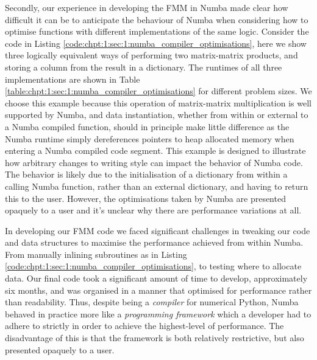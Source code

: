 Secondly, our experience in developing the FMM in Numba made clear how difficult it can be to anticipate the behaviour of Numba when considering how to optimise functions with different implementations of the same logic. Consider the code in Listing \ref{code:chpt:1:sec:1:numba_compiler_optimisations}, here we show three logically equivalent ways of performing two matrix-matrix products, and storing a column from the result in a dictionary. The runtimes of all three implementations are shown in Table \ref{table:chpt:1:sec:1:numba_compiler_optimisations} for different problem sizes. We choose this example because this operation of matrix-matrix multiplication is well supported by Numba, and data instantiation, whether from within or external to a Numba compiled function, should in principle make little difference as the Numba runtime simply dereferences pointers to heap allocated memory when entering a Numba compiled code segment. This example is designed to illustrate how arbitrary changes to writing style can impact the behavior of Numba code. The behavior is likely due to the initialisation of a dictionary from within a calling Numba function, rather than an external dictionary, and having to return this to the user. However, the optimisations taken by Numba are presented opaquely to a user and it's unclear why there are performance variations at all.

In developing our FMM code we faced significant challenges in tweaking our code and data structures to maximise the performance achieved from within Numba. From manually inlining subroutines as in Listing \ref{code:chpt:1:sec:1:numba_compiler_optimisations}, to testing where to allocate data. Our final code took a significant amount of time to develop, approximately six months, and was organised in a manner that optimised for performance rather than readability. Thus, despite being a \textit{compiler} for numerical Python, Numba behaved in practice more like a \textit{programming framework} which a developer had to adhere to strictly in order to achieve the highest-level of performance. The disadvantage of this is that the framework is both relatively restrictive, but also presented opaquely to a user.

